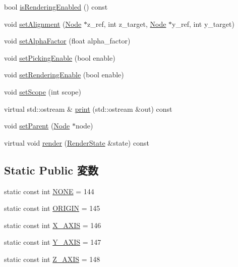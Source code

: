\begin{CompactItemize}
bool \hyperlink{classm3g_1_1Node_95020b155afed9552cc55377b09b1e86}{isRenderingEnabled} () const 
\item 
void \hyperlink{classm3g_1_1Node_dd1627aba90e63c166ecd3d7463d735a}{setAlignment} (\hyperlink{classm3g_1_1Node}{Node} $\ast$z\_\-ref, int z\_\-target, \hyperlink{classm3g_1_1Node}{Node} $\ast$y\_\-ref, int y\_\-target)
\item 
void \hyperlink{classm3g_1_1Node_b33c321ce240770e5eb64d0e20ea61cc}{setAlphaFactor} (float alpha\_\-factor)
\item 
void \hyperlink{classm3g_1_1Node_4f9296202713ac56ccae72d5e0c21d96}{setPickingEnable} (bool enable)
\item 
void \hyperlink{classm3g_1_1Node_58981ef7aea1bf0e630bcc065b2987e9}{setRenderingEnable} (bool enable)
\item 
void \hyperlink{classm3g_1_1Node_55f324f307a01705b9094a73af4ecd68}{setScope} (int scope)
\item 
virtual std::ostream \& \hyperlink{classm3g_1_1Node_6fea17fa1532df3794f8cb39cb4f911f}{print} (std::ostream \&out) const 
\item 
void \hyperlink{classm3g_1_1Node_880ecc7c1c091f7607eeae12ed100a9a}{setParent} (\hyperlink{classm3g_1_1Node}{Node} $\ast$node)
\item 
virtual void \hyperlink{classm3g_1_1Node_8babc8a79b78615da51161e94029eea9}{render} (\hyperlink{structm3g_1_1RenderState}{RenderState} \&state) const 
\end{CompactItemize}
\subsection*{Static Public 変数}
\begin{CompactItemize}
\item 
static const int \hyperlink{classm3g_1_1Node_7b20f1b443e093d5ec5e990e73b47232}{NONE} = 144
\item 
static const int \hyperlink{classm3g_1_1Node_1b0d56eb173868ff472a6fd296c5bb6c}{ORIGIN} = 145
\item 
static const int \hyperlink{classm3g_1_1Node_dd4bccb7b9c652e726d58b06bd28dab2}{X\_\-AXIS} = 146
\item 
static const int \hyperlink{classm3g_1_1Node_3248ff73b5411ab0a66a38c451c8b6fe}{Y\_\-AXIS} = 147
\item 
static const int \hyperlink{classm3g_1_1Node_a928e648c9ae9b4706937831f77f0c67}{Z\_\-AXIS} = 148
\end{CompactItemize}
